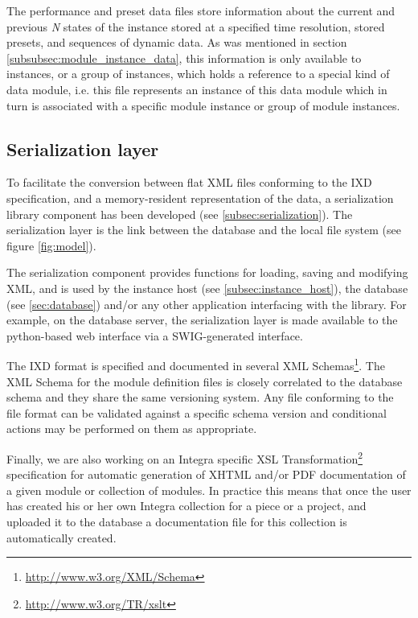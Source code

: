 \documentclass{article}
\begin{document}
The performance and preset data files store information about the current and previous \emph{N} states of the instance stored at a specified time resolution, stored presets, and sequences of dynamic data. As was mentioned in section \ref{subsubsec:module_instance_data}, this information is only available to instances, or a group of instances, which holds a reference to a special kind of data module, i.e. this file represents an instance of this data module which in turn is associated with a specific module instance or group of module instances.

\subsection{Serialization layer}\label{sec:serialization_layer}

To facilitate the conversion between flat XML files conforming to the IXD specification, and a memory-resident representation of the data, a serialization library component has been developed (see \ref{subsec:serialization}). The serialization layer is the link  between the database and the local file system (see figure \ref{fig:model}).

The serialization component provides functions for loading, saving and modifying XML, and is used by the instance host (see \ref{subsec:instance_host}), the database (see \ref{sec:database}) and/or any other application interfacing with the library. For example, on the database server, the serialization layer is made available to the python-based web interface via a SWIG-generated interface.

The IXD format is specified and documented in several XML Schemas\footnote{\url{http://www.w3.org/XML/Schema}}. The XML Schema for the module definition files is closely correlated to the database schema and they share the same versioning system. Any file conforming to the file format can be validated against a specific schema version and conditional actions may be performed on them as appropriate.

Finally, we are also working on an Integra specific XSL Transformation\footnote{\url{http://www.w3.org/TR/xslt}} specification for automatic generation of XHTML and/or PDF documentation of a given module or collection of modules. In practice this means that once the user has created his or her own Integra collection for a piece or a project, and uploaded it to the database a documentation file for this collection is automatically created.
\end{document}
